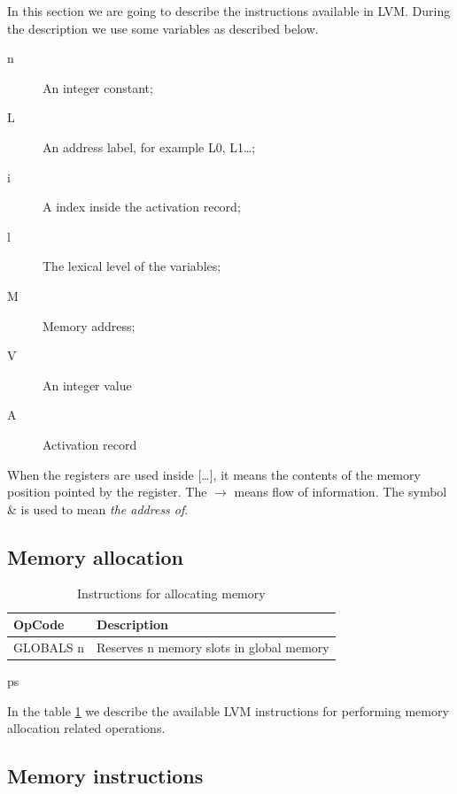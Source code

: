 \documentclass[a4paper, 11pt]{report}
\newcommand{\arrow}{\ensuremath{\rightarrow}}
\begin{document}
In this section we are going to describe the instructions available in LVM. During the
description we use some variables as described below.

\begin{description}
\item[n] An integer constant;
\item[L] An address label, for example L0, L1\dots;
\item[i] A index inside the activation record;
\item[l] The lexical level of the variables;
\item[M] Memory address;
\item[V] An integer value
\item[A] Activation record
\end{description} 

When the registers are used inside [\dots], it means the contents of the
memory position pointed by the register. The \arrow{} means flow of information.
The symbol \& is used to mean \emph{the address of}.

\subsection{Memory allocation}

\begin{table}[htb]
 \begin{tabular}{|l|l|}
  \hline
  OpCode & Description\\
  \hline\hline
  GLOBALS n & Reserves n memory slots in global memory\\
  \hline
 \end{tabular}
 \caption{Instructions for allocating memory}
ps \label{tbl:memalloc}
\end{table}

In the table \ref{tbl:memalloc} we describe the available LVM instructions for performing memory
allocation related operations.

\subsection{Memory instructions}
\end{document}
